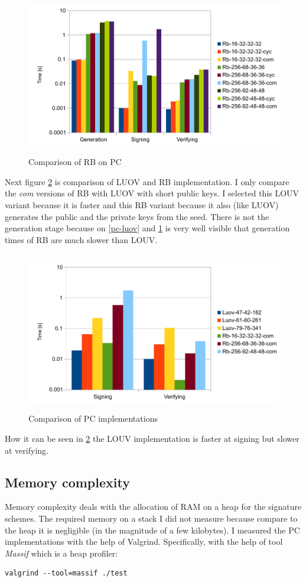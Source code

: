 \documentclass[thesis=M,english]{FITthesis}[2019/12/23]
\begin{document}
\begin{figure}[H]
\centering
\includegraphics[width=13cm,height=7cm]{images/pc-rb.pdf}
\caption{Comparison of RB on PC}
\label{pc-rb}
\end{figure}

\noindent
Next figure \ref{pc-all} is comparison of LUOV and RB implementation. I only compare the \textit{com} versions of RB with LUOV with short public keys. I selected this LOUV variant because it is faster and this RB variant because it also (like LUOV) generates the public and the private keys from the seed.
There is not the generation stage because on \ref{pc-luov} and \ref{pc-rb} is very well visible that generation times of RB are much slower than LOUV. 

\begin{figure}[H]
\centering
\includegraphics[width=13cm,height=7cm]{images/pc-all.pdf}
\caption{Comparison of PC implementations}
\label{pc-all}
\end{figure}

\noindent
How it can be seen in \ref{pc-all} the LOUV implementation is faster at signing but slower at verifying.

\subsection{Memory complexity}\label{pc-mem-measurement}
Memory complexity deals with the allocation of RAM on a heap for the signature schemes. The required memory on a stack I did not measure because compare to the heap it is negligible (in the magnitude of a few kilobytes). I measured the PC implementations with the help of Valgrind. Specifically, with the help of tool \textit{Massif} which is a heap profiler:
\begin{lstlisting}[frame=single]
valgrind --tool=massif ./test
\end{lstlisting}
\end{document}
